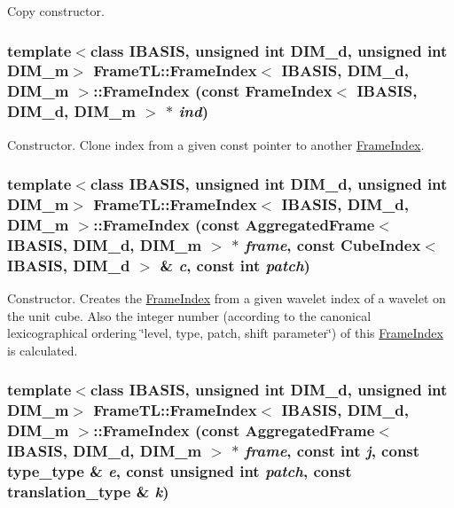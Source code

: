 Copy constructor. \hypertarget{classFrameTL_1_1FrameIndex_2300543ef2fc0fa938f2d8bb53902092}{
\subsubsection[FrameIndex]{\setlength{\rightskip}{0pt plus 5cm}template$<$class IBASIS, unsigned int DIM\_\-d, unsigned int DIM\_\-m$>$ {\bf FrameTL::FrameIndex}$<$ IBASIS, DIM\_\-d, DIM\_\-m $>$::{\bf FrameIndex} (const {\bf FrameIndex}$<$ IBASIS, DIM\_\-d, DIM\_\-m $>$ $\ast$ {\em ind})}}
\label{classFrameTL_1_1FrameIndex_2300543ef2fc0fa938f2d8bb53902092}


Constructor. Clone index from a given const pointer to another \hyperlink{classFrameTL_1_1FrameIndex}{FrameIndex}. \hypertarget{classFrameTL_1_1FrameIndex_38bc47d11409b690b23e93d616e1ca02}{
\subsubsection[FrameIndex]{\setlength{\rightskip}{0pt plus 5cm}template$<$class IBASIS, unsigned int DIM\_\-d, unsigned int DIM\_\-m$>$ {\bf FrameTL::FrameIndex}$<$ IBASIS, DIM\_\-d, DIM\_\-m $>$::{\bf FrameIndex} (const {\bf AggregatedFrame}$<$ IBASIS, DIM\_\-d, DIM\_\-m $>$ $\ast$ {\em frame}, \/  const CubeIndex$<$ IBASIS, DIM\_\-d $>$ \& {\em c}, \/  const int {\em patch})}}
\label{classFrameTL_1_1FrameIndex_38bc47d11409b690b23e93d616e1ca02}


Constructor. Creates the \hyperlink{classFrameTL_1_1FrameIndex}{FrameIndex} from a given wavelet index of a wavelet on the unit cube. Also the integer number (according to the canonical lexicographical ordering \char`\"{}level, type, patch, shift parameter\char`\"{}) of this \hyperlink{classFrameTL_1_1FrameIndex}{FrameIndex} is calculated. \hypertarget{classFrameTL_1_1FrameIndex_f911f080552f2b21b77625929003b514}{
\subsubsection[FrameIndex]{\setlength{\rightskip}{0pt plus 5cm}template$<$class IBASIS, unsigned int DIM\_\-d, unsigned int DIM\_\-m$>$ {\bf FrameTL::FrameIndex}$<$ IBASIS, DIM\_\-d, DIM\_\-m $>$::{\bf FrameIndex} (const {\bf AggregatedFrame}$<$ IBASIS, DIM\_\-d, DIM\_\-m $>$ $\ast$ {\em frame}, \/  const int {\em j}, \/  const {\bf type\_\-type} \& {\em e}, \/  const unsigned int {\em patch}, \/  const {\bf translation\_\-type} \& {\em k})}}
\label{classFrameTL_1_1FrameIndex_f911f080552f2b21b77625929003b514}



